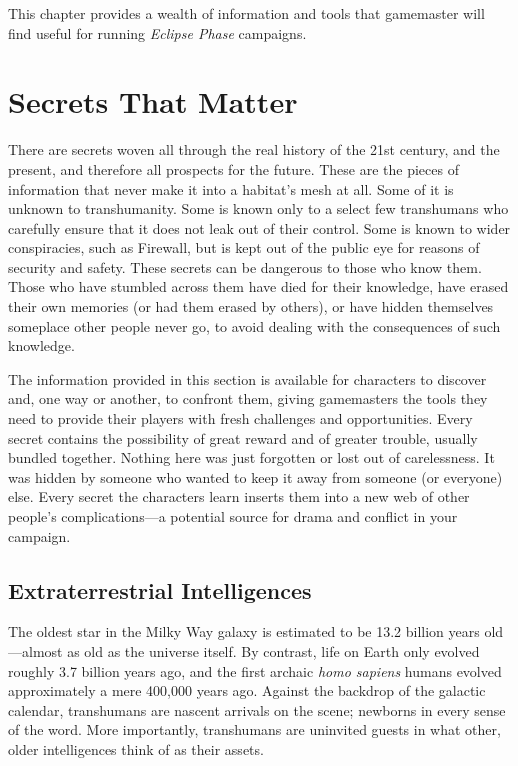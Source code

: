 This chapter provides a wealth of information and tools that gamemaster will find useful for running \textit{Eclipse Phase} campaigns. 

\section{Secrets That Matter} 

There are secrets woven all through the real history of the 21st century, and the present, and therefore all prospects for the future. These are the pieces of information that never make it into a habitat's mesh at all. Some of it is unknown to transhumanity. Some is known only to a select few transhumans who carefully ensure that it does not leak out of their control. Some is known to wider conspiracies, such as Firewall, but is kept out of the public eye for reasons of security and safety. These secrets can be dangerous to those who know them. Those who have stumbled across them have died for their knowledge, have erased their own memories (or had them erased by others), or have hidden themselves someplace other people never go, to avoid dealing with the consequences of such knowledge. 

The information provided in this section is available for characters to discover and, one way or another, to confront them, giving gamemasters the tools they need to provide their players with fresh challenges and opportunities. Every secret contains the possibility of great reward and of greater trouble, usually bundled together. Nothing here was just forgotten or lost out of carelessness. It was hidden by someone who wanted to keep it away from someone (or everyone) else. Every secret the characters learn inserts them into a new web of other people's complications—a potential source for drama and conflict in your campaign. 

\subsection{Extraterrestrial Intelligences} 

The oldest star in the Milky Way galaxy is estimated to be 13.2 billion years old—almost as old as the universe itself. By contrast, life on Earth only evolved roughly 3.7 billion years ago, and the first archaic \textit{homo sapiens} humans evolved approximately a mere 400,000 years ago. Against the backdrop of the galactic calendar, transhumans are nascent arrivals on the scene; newborns in every sense of the word. More importantly, transhumans are uninvited guests in what other, older intelligences think of as their assets. 

